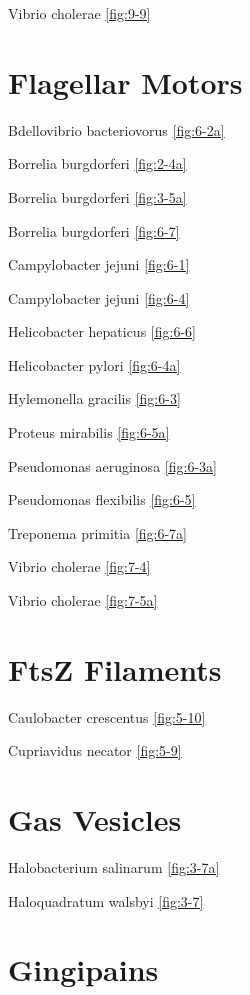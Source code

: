 \documentclass[]{tufte-book}
\begin{document}
Vibrio cholerae \ref{fig:9-9}

\hypertarget{flagellar-motors}{%
\section*{Flagellar Motors}\label{flagellar-motors}}

Bdellovibrio bacteriovorus \ref{fig:6-2a}

Borrelia burgdorferi \ref{fig:2-4a}

Borrelia burgdorferi \ref{fig:3-5a}

Borrelia burgdorferi \ref{fig:6-7}

Campylobacter jejuni \ref{fig:6-1}

Campylobacter jejuni \ref{fig:6-4}

Helicobacter hepaticus \ref{fig:6-6}

Helicobacter pylori \ref{fig:6-4a}

Hylemonella gracilis \ref{fig:6-3}

Proteus mirabilis \ref{fig:6-5a}

Pseudomonas aeruginosa \ref{fig:6-3a}

Pseudomonas flexibilis \ref{fig:6-5}

Treponema primitia \ref{fig:6-7a}

Vibrio cholerae \ref{fig:7-4}

Vibrio cholerae \ref{fig:7-5a}

\hypertarget{ftsz-filaments}{%
\section*{FtsZ Filaments}\label{ftsz-filaments}}

Caulobacter crescentus \ref{fig:5-10}

Cupriavidus necator \ref{fig:5-9}

\hypertarget{gas-vesicles}{%
\section*{Gas Vesicles}\label{gas-vesicles}}

Halobacterium salinarum \ref{fig:3-7a}

Haloquadratum walsbyi \ref{fig:3-7}

\hypertarget{gingipains}{%
\section*{Gingipains}\label{gingipains}}
\end{document}

